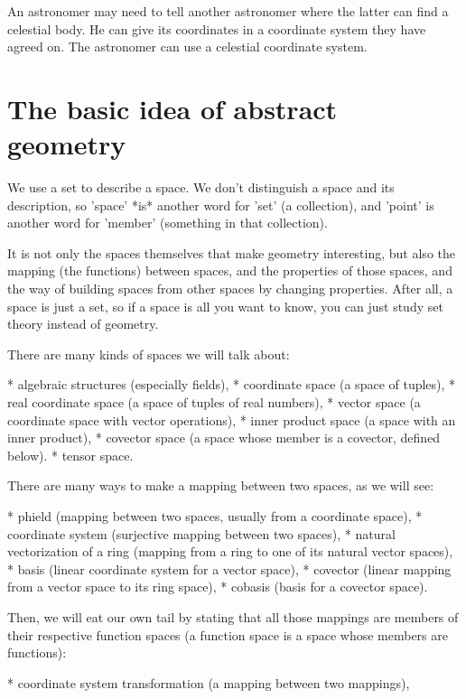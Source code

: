 An astronomer may need to tell another astronomer where the latter can find a celestial body.
He can give its coordinates in a coordinate system they have agreed on.
The astronomer can use a celestial coordinate system.

\section{The basic idea of abstract geometry}

We use a set to describe a space.
We don't distinguish a space and its description,
so 'space' *is* another word for 'set' (a collection),
and 'point' is another word for 'member' (something in that collection).

It is not only the spaces themselves that make geometry interesting,
but also the mapping (the functions) between spaces,
and the properties of those spaces,
and the way of building spaces from other spaces by changing properties.
After all, a space is just a set,
so if a space is all you want to know,
you can just study set theory instead of geometry.

There are many kinds of spaces we will talk about:

* algebraic structures (especially fields),
* coordinate space (a space of tuples),
* real coordinate space (a space of tuples of real numbers),
* vector space (a coordinate space with vector operations),
* inner product space (a space with an inner product),
* covector space (a space whose member is a covector, defined below).
* tensor space.

There are many ways to make a mapping between two spaces,
as we will see:

* phield (mapping between two spaces, usually from a coordinate space),
* coordinate system (surjective mapping between two spaces),
* natural vectorization of a ring (mapping from a ring to one of its natural vector spaces),
* basis (linear coordinate system for a vector space),
* covector (linear mapping from a vector space to its ring space),
* cobasis (basis for a covector space).

Then, we will eat our own tail by stating that all those mappings are members of their respective function spaces
(a function space is a space whose members are functions):

* coordinate system transformation (a mapping between two mappings),

